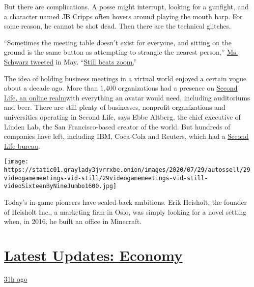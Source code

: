 But there are complications. A posse might interrupt, looking for a
gunfight, and a character named JB Cripps often hovers around playing
the mouth harp. For some reason, he cannot be shot dead. Then there are
the technical glitches.

``Sometimes the meeting table doesn't exist for everyone, and sitting on
the ground is the same button as attempting to strangle the nearest
person,''
\href{https://twitter.com/vivschwarz/status/1261577497105358848}{Ms.
Schwarz tweeted} in May.
``\href{https://www.nytimes3xbfgragh.onion/2020/06/29/business/zoom-shirt.html}{Still
beats zoom.}''

The idea of holding business meetings in a virtual world enjoyed a
certain vogue about a decade ago. More than 1,400 organizations had a
presence on
\href{https://www.nytimes3xbfgragh.onion/2006/10/19/technology/19virtual.html}{Second
Life, an online realm}with everything an avatar would need, including
auditoriums and beer. There are still plenty of businesses, nonprofit
organizations and universities operating in Second Life, says Ebbe
Altberg, the chief executive of Linden Lab, the San Francisco-based
creator of the world. But hundreds of companies have left, including
IBM, Coca-Cola and Reuters, which had a
\href{https://www.nytimes3xbfgragh.onion/2006/10/16/technology/16reuters.html}{Second
Life bureau}.

\texttt{[image: https://static01.graylady3jvrrxbe.onion/images/2020/07/29/autossell/29videogamemeetings-vid-still/29videogamemeetings-vid-still-videoSixteenByNineJumbo1600.jpg]}

Today's in-game pioneers have scaled-back ambitions. Erik Heisholt, the
founder of Heisholt Inc., a marketing firm in Oslo, was simply looking
for a novel setting when, in 2016, he built an office in Minecraft.

\hypertarget{latest-updates-economy}{%
\section{\texorpdfstring{\href{https://www.nytimes3xbfgragh.onion/live/2020/07/31/business/stock-market-today-coronavirus?action=click\&pgtype=Article\&state=default\&region=MAIN_CONTENT_1\&context=storylines_live_updates}{Latest
Updates:
Economy}}{Latest Updates: Economy}}\label{latest-updates-economy}}

\href{https://www.nytimes3xbfgragh.onion/live/2020/07/31/business/stock-market-today-coronavirus?action=click\&pgtype=Article\&state=default\&region=MAIN_CONTENT_1\&context=storylines_live_updates\#kodaks-chief-executive-was-given-stock-options-then-the-share-price-spiked-1000-percent}{31h
ago}

